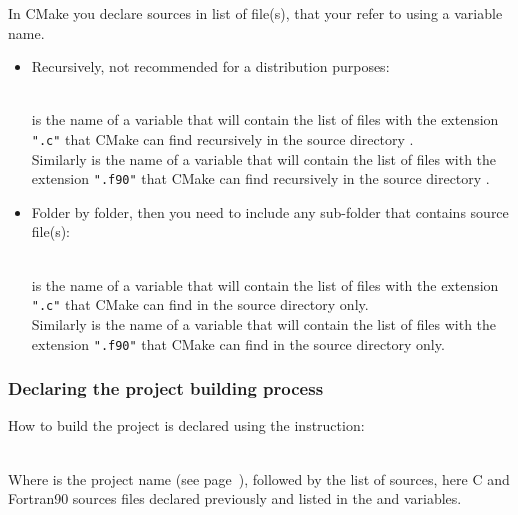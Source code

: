 In CMake you declare sources in list of file(s), that your refer to using a variable name.
\begin{itemize}
\item Recursively, not recommended for a distribution purposes:
{\footnotesize{
\begin{scripti}
\end{scripti}
}} \\[-0.5cm]
\noindent {} is the name of a variable that will contain the list of files with the extension \texttt{".c"} that CMake can find recursively in the source directory \texttt{}. \\
Similarly  is the name of a variable that will contain the list of files with the extension \texttt{".f90"} that CMake can find recursively in the source directory \texttt{}.
\item Folder by folder, then you need to include any sub-folder that contains source file(s):
{\footnotesize{
\begin{scripti}
\end{scripti}
}} \\[-0.5cm]
\noindent {} is the name of a variable that will contain the list of files with the extension \texttt{".c"} that CMake can find in the source directory \texttt{} only. \\
Similarly  is the name of a variable that will contain the list of files with the extension \texttt{".f90"} that CMake can find in the source directory \texttt{} only. 
\end{itemize}

\newpage
\subsubsection*{Declaring the project building process}

How to build the project is declared using the  instruction:
\begin{script}
\end{script}
\\[-0.25cm]
\noindent Where  is the project name (see page~\pageref{cmake_pname}), followed by the list of sources, here C and Fortran90 sources files declared previously and listed in the  and  variables. 

